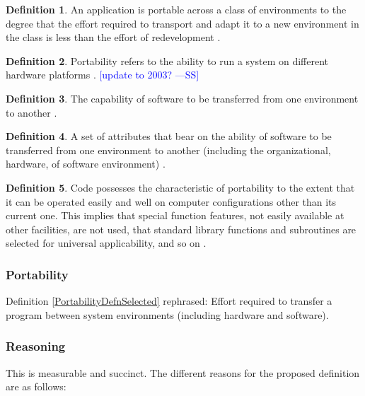 \documentclass[letterpaper, cleveref]{lipics-v2019}
\newcommand{\authornote}[3]{\textcolor{#1}{[#3 ---#2]}}
\newcommand{\authornote}[3]{}
\newcommand{\wss}[1]{\authornote{blue}{SS}{#1}} %
\theoremstyle{definition}
\newtheorem{defn}{Definition}
\begin{document}
\begin{defn}
  An application is portable across a class of environments to the degree
  that the effort required to transport and adapt it to a new environment in
  the class is less than the effort of redevelopment
  \citep{mooney1990strategies}.
\end{defn}

\begin{defn}
  Portability refers to the ability to run a system on different hardware
  platforms \citep{ghezzi1991fundamentals}.  \wss{update to 2003?}
\end{defn}

\begin{defn}
  The capability of software to be transferred from one environment to
  another \cite{ISO9126}. %
\end{defn}

\begin{defn}
  A set of attributes that bear on the ability of software to be transferred
  from one environment to another (including the organizational, hardware, of
  software environment) \citep{pfleeger2006software}.
\end{defn}

\begin{defn}
  Code possesses the characteristic of portability to the extent that it can
  be operated easily and well on computer configurations other than its
  current one. This implies that special function features, not easily
  available at other facilities, are not used, that standard library
  functions and subroutines are selected for universal applicability, and so
  on \citep{boehm2007software}.
\end{defn}

\begin{mybox}
\subsubsection*{Portability}
Definition \ref{PortabilityDefnSelected} rephrased: Effort required to transfer
a program between system environments (including hardware and software).
\end{mybox}

\subsubsection*{Reasoning}

This is measurable and succinct.   The different reasons for the proposed
definition are as follows:
\end{document}
